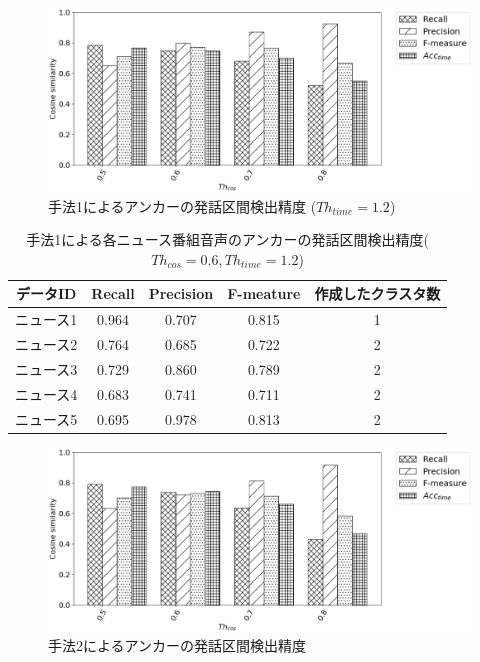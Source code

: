 \begin{figure}[H]
  \begin{center}
    \includegraphics[scale=0.5]{./figure/prob1_12.eps}
  \end{center}
  \caption{手法1によるアンカーの発話区間検出精度 ($Th_{time}=1.2$) \label{fig:result_anchor_prob1}}
\end{figure}

\begin{table}[H]
  \begin{center}
    \caption{手法1による各ニュース番組音声のアンカーの発話区間検出精度($Th_{cos}=0.6,Th_{time}=1.2$) }
    \begin{tabular}{|c||c|c|c|c|} \hline
データID & Recall & Precision & F-meature & 作成したクラスタ数\\ \hline
ニュース1 & 0.964 & 0.707 & 0.815 & 1 \\ \hline
ニュース2 & 0.764 & 0.685 & 0.722 & 2 \\ \hline
ニュース3 & 0.729 & 0.860 & 0.789 & 2 \\ \hline
ニュース4 & 0.683 & 0.741 & 0.711 & 2 \\ \hline
ニュース5 & 0.695 & 0.978 & 0.813 & 2 \\ \hline
    \end{tabular}
  \end{center}
\end{table}

\begin{figure}[H]
  \begin{center}
    \includegraphics[scale=0.5]{./figure/prob2.eps}
  \end{center}
  \caption{手法2によるアンカーの発話区間検出精度 \label{fig:result_anchor_prob2}}
\end{figure}

